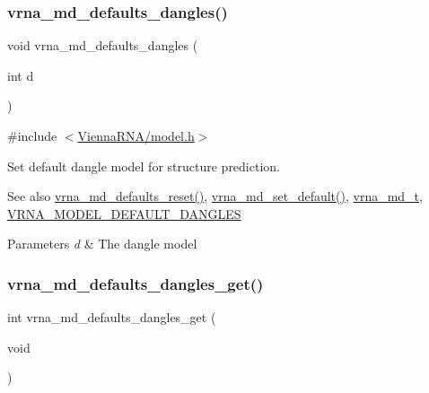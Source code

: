 \subsubsection{\texorpdfstring{vrna\+\_\+md\+\_\+defaults\+\_\+dangles()}{vrna\_md\_defaults\_dangles()}}
{\footnotesize\ttfamily void vrna\+\_\+md\+\_\+defaults\+\_\+dangles (\begin{DoxyParamCaption}\item[{int}]{d }\end{DoxyParamCaption})}



{\ttfamily \#include $<$\mbox{\hyperlink{model_8h}{Vienna\+R\+N\+A/model.\+h}}$>$}



Set default dangle model for structure prediction. 

\begin{DoxySeeAlso}{See also}
\mbox{\hyperlink{group__model__details_ga70834424cf804d149937de89f80ceb45}{vrna\+\_\+md\+\_\+defaults\+\_\+reset()}}, \mbox{\hyperlink{group__model__details_ga8ac6ff84936282436f822644bf841f66}{vrna\+\_\+md\+\_\+set\+\_\+default()}}, \mbox{\hyperlink{group__model__details_ga1f8a10e12a0a1915f2a4eff0b28ea17c}{vrna\+\_\+md\+\_\+t}}, \mbox{\hyperlink{group__model__details_ga2aa7bc2cae774b83a5c468f824c27a42}{V\+R\+N\+A\+\_\+\+M\+O\+D\+E\+L\+\_\+\+D\+E\+F\+A\+U\+L\+T\+\_\+\+D\+A\+N\+G\+L\+ES}} 
\end{DoxySeeAlso}

\begin{DoxyParams}{Parameters}
{\em d} & The dangle model \\
\hline
\end{DoxyParams}
\mbox{\label{group__model__details_ga67ca06f95ae133778c79a4493c9817b8}} 
\subsubsection{\texorpdfstring{vrna\+\_\+md\+\_\+defaults\+\_\+dangles\+\_\+get()}{vrna\_md\_defaults\_dangles\_get()}}
{\footnotesize\ttfamily int vrna\+\_\+md\+\_\+defaults\+\_\+dangles\+\_\+get (\begin{DoxyParamCaption}\item[{void}]{ }\end{DoxyParamCaption})}




